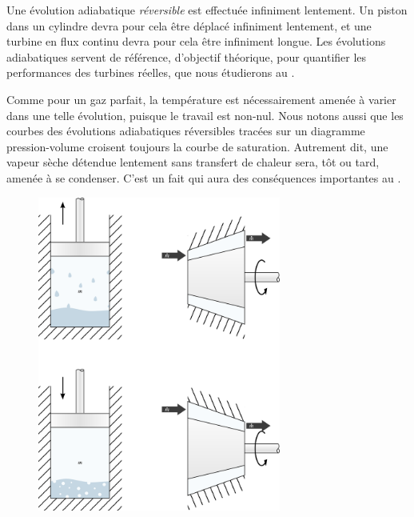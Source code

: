 		Une évolution adiabatique \emph{réversible} est effectuée infiniment lentement. Un piston dans un cylindre devra pour cela être déplacé infiniment lentement, et une turbine en flux continu devra pour cela être infiniment longue. Les évolutions adiabatiques servent de référence, d’objectif théorique, pour quantifier les performances des turbines réelles, que nous étudierons au \coursneufshort.
		
		Comme pour un gaz parfait, la température est nécessairement amenée à varier dans une telle évolution, puisque le travail est non-nul. Nous notons aussi que les courbes des évolutions adiabatiques réversibles tracées sur un diagramme pression-volume croisent toujours la courbe de saturation. Autrement dit, une vapeur sèche détendue lentement sans transfert de chaleur sera, tôt ou tard, amenée à se condenser. C’est un fait qui aura des conséquences importantes au \coursneuf.

		\begin{figure}
			\begin{center}
				\includegraphics[width=8cm]{images/lv_isentropique.png}
			\end{center}
			\label{fig_lv_isentropique}
		\end{figure}
		
